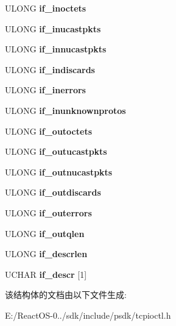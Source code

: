 \begin{DoxyCompactItemize}
\mbox{\label{struct_i_f_entry_a8d45071f7489cb116e69070cf36193c0}} 
U\+L\+O\+NG {\bfseries if\+\_\+inoctets}
\item 
\mbox{\label{struct_i_f_entry_af8ad3475b45482f69d22d68fbfcfdbd5}} 
U\+L\+O\+NG {\bfseries if\+\_\+inucastpkts}
\item 
\mbox{\label{struct_i_f_entry_a685b8d6ef8557bf3b18514862919e0ff}} 
U\+L\+O\+NG {\bfseries if\+\_\+innucastpkts}
\item 
\mbox{\label{struct_i_f_entry_a450e333df80797a9c12d0d022bd0d665}} 
U\+L\+O\+NG {\bfseries if\+\_\+indiscards}
\item 
\mbox{\label{struct_i_f_entry_a40b0b049da68f3de279014b65d73f722}} 
U\+L\+O\+NG {\bfseries if\+\_\+inerrors}
\item 
\mbox{\label{struct_i_f_entry_a5d78464fe6276a8e4e78a3cba4a2e0bb}} 
U\+L\+O\+NG {\bfseries if\+\_\+inunknownprotos}
\item 
\mbox{\label{struct_i_f_entry_ac2bfc1ef5eec7997b99e963960264681}} 
U\+L\+O\+NG {\bfseries if\+\_\+outoctets}
\item 
\mbox{\label{struct_i_f_entry_a63a771e92478dd1790188085e45c4af6}} 
U\+L\+O\+NG {\bfseries if\+\_\+outucastpkts}
\item 
\mbox{\label{struct_i_f_entry_a6e4abf973fea965f49e78b0ad0bf8635}} 
U\+L\+O\+NG {\bfseries if\+\_\+outnucastpkts}
\item 
\mbox{\label{struct_i_f_entry_a7e300b7207ee8439a89474292fc55623}} 
U\+L\+O\+NG {\bfseries if\+\_\+outdiscards}
\item 
\mbox{\label{struct_i_f_entry_ad6b618e9e5d1815627328136035172db}} 
U\+L\+O\+NG {\bfseries if\+\_\+outerrors}
\item 
\mbox{\label{struct_i_f_entry_ae46cb4e6b806c1f39c71b0f60eabf0b4}} 
U\+L\+O\+NG {\bfseries if\+\_\+outqlen}
\item 
\mbox{\label{struct_i_f_entry_a7092b876bd8092923a1560290d99b086}} 
U\+L\+O\+NG {\bfseries if\+\_\+descrlen}
\item 
\mbox{\label{struct_i_f_entry_a27d3423845c4c8db4d5cf09d1ef68591}} 
U\+C\+H\+AR {\bfseries if\+\_\+descr} \mbox{[}1\mbox{]}
\end{DoxyCompactItemize}


该结构体的文档由以下文件生成\+:\begin{DoxyCompactItemize}
\item 
E\+:/\+React\+O\+S-\/0../sdk/include/psdk/tcpioctl.\+h\end{DoxyCompactItemize}
